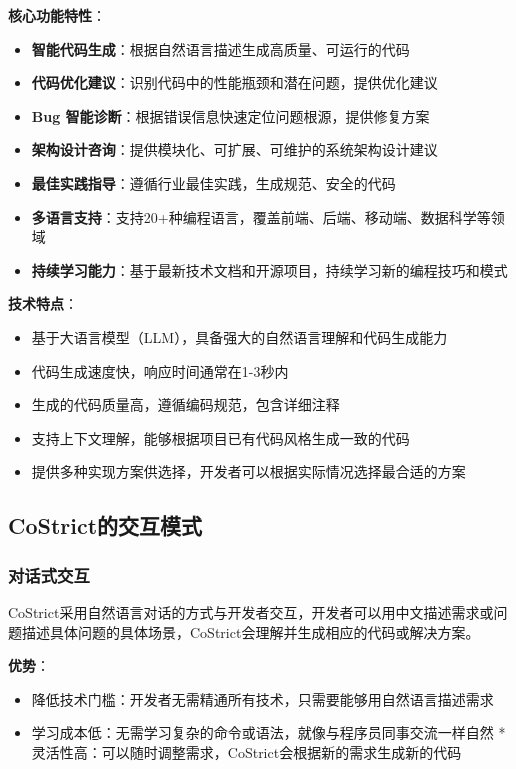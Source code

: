 ﻿\documentclass[12pt,a4paper]{article}
\begin{document}
\textbf{核心功能特性}：

\begin{itemize}
    \item \textbf{智能代码生成}：根据自然语言描述生成高质量、可运行的代码
    \item \textbf{代码优化建议}：识别代码中的性能瓶颈和潜在问题，提供优化建议
    \item \textbf{Bug 智能诊断}：根据错误信息快速定位问题根源，提供修复方案
    \item \textbf{架构设计咨询}：提供模块化、可扩展、可维护的系统架构设计建议
    \item \textbf{最佳实践指导}：遵循行业最佳实践，生成规范、安全的代码
    \item \textbf{多语言支持}：支持20+种编程语言，覆盖前端、后端、移动端、数据科学等领域
    \item \textbf{持续学习能力}：基于最新技术文档和开源项目，持续学习新的编程技巧和模式
\end{itemize}

\textbf{技术特点}：
\begin{itemize}
    \item 基于大语言模型（LLM），具备强大的自然语言理解和代码生成能力
    \item 代码生成速度快，响应时间通常在1-3秒内
    \item 生成的代码质量高，遵循编码规范，包含详细注释
    \item 支持上下文理解，能够根据项目已有代码风格生成一致的代码
    \item 提供多种实现方案供选择，开发者可以根据实际情况选择最合适的方案
\end{itemize}

\subsection{CoStrict的交互模式}

\subsubsection{对话式交互}

CoStrict采用自然语言对话的方式与开发者交互，开发者可以用中文描述需求或问题描述具体问题的具体场景，CoStrict会理解并生成相应的代码或解决方案。

\textbf{优势}：
\begin{itemize}
    \item 降低技术门槛：开发者无需精通所有技术，只需要能够用自然语言描述需求
    \item 学习成本低：无需学习复杂的命令或语法，就像与程序员同事交流一样自然
    * 灵活性高：可以随时调整需求，CoStrict会根据新的需求生成新的代码
\end{itemize}
\end{document}
